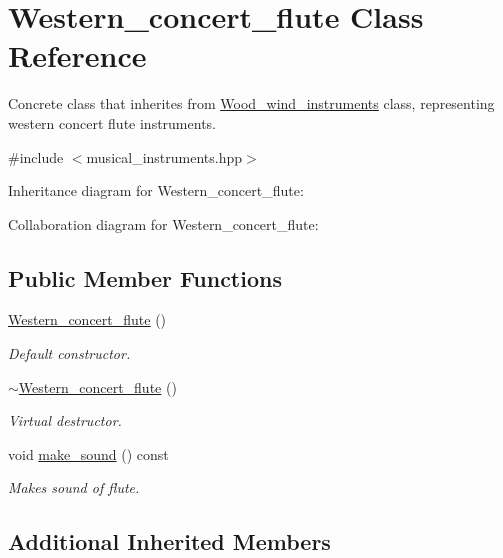 \hypertarget{classWestern__concert__flute}{}\section{Western\+\_\+concert\+\_\+flute Class Reference}
\label{classWestern__concert__flute}


Concrete class that inherites from \hyperlink{classWood__wind__instruments}{Wood\+\_\+wind\+\_\+instruments} class, representing western concert flute instruments.  




{\ttfamily \#include $<$musical\+\_\+instruments.\+hpp$>$}



Inheritance diagram for Western\+\_\+concert\+\_\+flute\+:


Collaboration diagram for Western\+\_\+concert\+\_\+flute\+:
\subsection*{Public Member Functions}
\begin{DoxyCompactItemize}
\item 
\hyperlink{classWestern__concert__flute_acb27c2670b23a7a06cca347890da4e87}{Western\+\_\+concert\+\_\+flute} ()
\begin{DoxyCompactList}\small\item\em Default constructor. \end{DoxyCompactList}\item 
\hyperlink{classWestern__concert__flute_a3f31ea1bdc736e8dc07ef09373aa2d52}{$\sim$\+Western\+\_\+concert\+\_\+flute} ()
\begin{DoxyCompactList}\small\item\em Virtual destructor. \end{DoxyCompactList}\item 
void \hyperlink{classWestern__concert__flute_a8a8b4cadc71df7dae18b8861db66c474}{make\+\_\+sound} () const 
\begin{DoxyCompactList}\small\item\em Makes sound of flute. \end{DoxyCompactList}\end{DoxyCompactItemize}
\subsection*{Additional Inherited Members}


